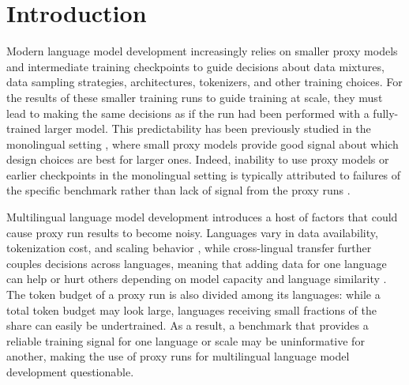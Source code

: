 \section{Introduction}
\label{sec:introduction}

Modern language model development increasingly relies on smaller proxy models and intermediate training checkpoints to guide decisions about data mixtures, data sampling strategies, architectures, tokenizers, and other training choices.
For the results of these smaller training runs to guide training at scale, they must lead to making the same decisions as if the run had been performed with a fully-trained larger model.
This predictability has been previously studied in the monolingual setting \citep{magnusson_datadecide_2025}, where small proxy models provide good signal about which design choices are best for larger ones. Indeed, inability to use proxy models or earlier checkpoints in the monolingual setting  is typically attributed to failures of the specific benchmark rather than lack of signal from the proxy runs
\citep{heineman_signal_2025}.

Multilingual language model development introduces a host of factors that could cause proxy run results to become noisy. %
Languages vary in data availability, tokenization cost, and scaling behavior \citep{petrov_language_2023, ahia_all_2023,mueninghof-data-constrained}, while cross-lingual transfer further couples decisions across languages, meaning that adding data for one language can help or hurt others depending on model capacity and language similarity \citep{chang_when_2023, longpre_atlas_2026}. 
The token budget of a proxy run is also divided among its languages: while a total token budget may look large, languages receiving small fractions of the share can easily be undertrained. 
As a result, a benchmark that provides a reliable training signal for one language or scale may be uninformative for another, making the use of proxy runs for multilingual language model development questionable.%

